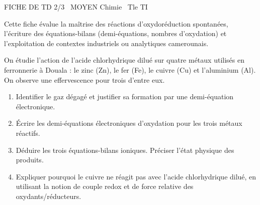 \documentclass[11pt]{article}
\begin{document}
\begin{tcolorbox}[enhanced,colback=popink,colframe=popink,arc=10pt,boxrule=0pt,left=12pt,right=12pt,top=9pt,bottom=9pt]
{\color{white}\popxbold\small FICHE DE TD 2/3 \textbullet\ MOYEN \hfill Chimie \textbullet\ Tle TI\par}
\end{tcolorbox}
\vspace{4pt}
\noindent Cette fiche évalue la maîtrise des réactions d'oxydoréduction spontanées, l'écriture des équations-bilans (demi-équations, nombres d'oxydation) et l'exploitation de contextes industriels ou analytiques camerounais.

\begin{exercice}
On étudie l'action de l'acide chlorhydrique dilué sur quatre métaux utilisés en ferronnerie à Douala : le zinc (Zn), le fer (Fe), le cuivre (Cu) et l'aluminium (Al). On observe une effervescence pour trois d'entre eux.
\begin{enumerate}
    \item Identifier le gaz dégagé et justifier sa formation par une demi-équation électronique.
    \item Écrire les demi-équations électroniques d'oxydation pour les trois métaux réactifs.
    \item Déduire les trois équations-bilans ioniques. Préciser l'état physique des produits.
    \item Expliquer pourquoi le cuivre ne réagit pas avec l'acide chlorhydrique dilué, en utilisant la notion de couple redox et de force relative des oxydants/réducteurs.
\end{enumerate}
\end{exercice}
\end{document}
